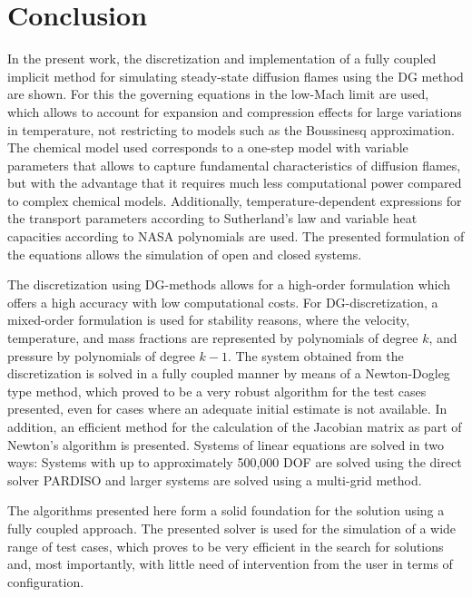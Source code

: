 \chapter{Conclusion}	\label{ch:conclusion}

In the present work, the discretization and implementation of a fully coupled implicit method for simulating steady-state diffusion flames using the DG method are shown. For this the governing equations in the low-Mach limit are used, which allows to account for expansion and compression effects for large variations in temperature, not restricting to models such as the Boussinesq approximation. The chemical model used corresponds to a one-step model with variable parameters that allows to capture fundamental characteristics of diffusion flames, but with the advantage that it requires much less computational power compared to complex chemical models.  Additionally, temperature-dependent expressions for the transport parameters according to Sutherland's law and variable heat capacities according to NASA polynomials are used. The presented formulation of the equations allows the simulation of open and closed systems. 

The discretization using DG-methods allows for a high-order formulation which offers a high accuracy with low computational costs. For DG-discretization, a mixed-order formulation is used for stability reasons, where the velocity, temperature, and mass fractions are represented by polynomials of degree $k$, and pressure by polynomials of degree $k-1$. The system obtained from the discretization is solved in a fully coupled manner by means of a Newton-Dogleg type method, which proved to be a very robust algorithm for the test cases presented, even for cases where an adequate initial estimate is not available. In addition, an efficient method for the calculation of the Jacobian matrix as part of Newton's algorithm is presented. Systems of linear equations are solved in two ways: Systems with up to approximately 500,000 \gls{DOF} are solved using the direct solver \gls{PARDISO} and larger systems are solved using a multi-grid method. 

The algorithms presented here form a solid foundation for the solution using a fully coupled approach. The presented solver is used for the simulation of a wide range of test cases, which proves to be very efficient in the search for solutions and, most importantly, with little need of intervention from the user in terms of configuration.

